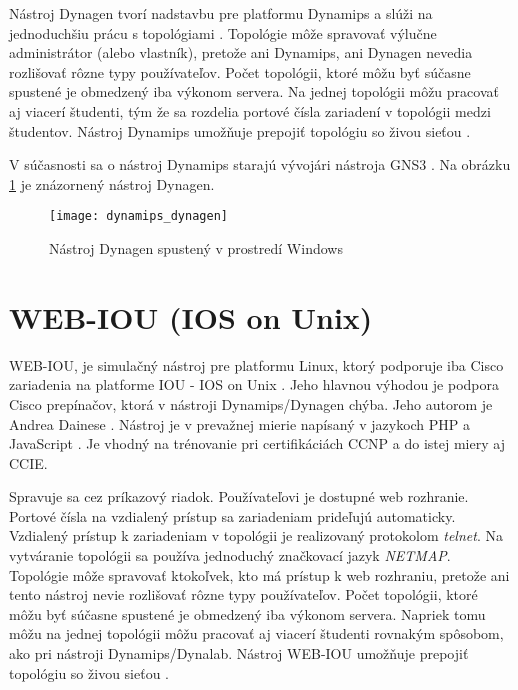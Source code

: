 Nástroj Dynagen tvorí nadstavbu pre platformu Dynamips a slúži na jednoduchšiu prácu s topológiami \cite{dynamips}. Topológie môže spravovať výlučne administrátor (alebo vlastník), pretože ani Dynamips, ani Dynagen nevedia rozlišovať rôzne typy používateľov. Počet topológii, ktoré môžu byť súčasne spustené je obmedzený iba výkonom servera. Na jednej topológii môžu pracovať aj viacerí študenti, tým že sa rozdelia portové čísla zariadení v topológii medzi študentov. Nástroj Dynamips umožňuje prepojiť topológiu so živou sieťou \cite{dynamips, dynamips_nil}.

V súčasnosti sa o nástroj Dynamips starajú vývojári nástroja GNS3 \cite{dynamips_github}. Na obrázku \ref{obr:dynamips_dynagen} je znázornený nástroj Dynagen.

\begin{figure}
    \centering
    \texttt{[image: dynamips\_dynagen]}
    \caption{Nástroj Dynagen spustený v prostredí Windows} \cite{obr_dynamips_dynagen}
    \label{obr:dynamips_dynagen}
\end{figure}





\section{WEB-IOU (IOS on Unix)}

WEB-IOU, je simulačný nástroj pre platformu Linux, ktorý podporuje iba Cisco zariadenia na platforme IOU - IOS on Unix \cite{webiou_firewall_cx}. Jeho hlavnou výhodou je podpora Cisco prepínačov, ktorá v nástroji Dynamips/Dynagen chýba. Jeho autorom je Andrea Dainese \cite{webiou_github, webiou_unetlab_unetlabv2}. Nástroj je v prevažnej mierie napísaný v jazykoch PHP a JavaScript \cite{webiou_github}. Je vhodný na trénovanie pri certifikáciách CCNP a do istej miery aj CCIE.

Spravuje sa cez príkazový riadok. Používateľovi je dostupné web rozhranie. Portové čísla na vzdialený prístup sa zariadeniam prideľujú automaticky. Vzdialený prístup k zariadeniam v topológii je realizovaný protokolom \emph{telnet}. Na vytváranie topológii sa používa jednoduchý značkovací jazyk \emph{NETMAP}. Topológie môže spravovať ktokoľvek, kto má prístup k web rozhraniu, pretože ani tento nástroj nevie rozlišovať rôzne typy používateľov. Počet topológii, ktoré môžu byť súčasne spustené je obmedzený iba výkonom servera. Napriek tomu môžu na jednej topológii môžu pracovať aj viacerí študenti rovnakým spôsobom, ako pri nástroji Dynamips/Dynalab. Nástroj WEB-IOU umožňuje prepojiť topológiu so živou sieťou \cite{webiou_real_network}. 

